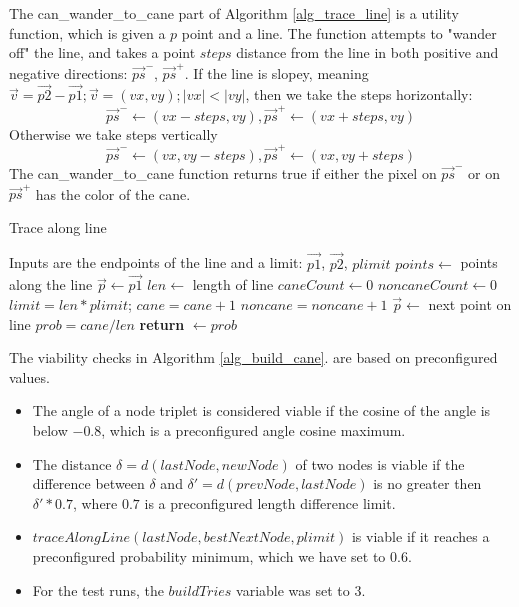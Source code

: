 \documentclass{PSAIE}%
\begin{document}
The can\_wander\_to\_cane part of Algorithm \ref{alg_trace_line} is a utility function, which is given
a $p$ point and a line. The function attempts to "wander off" the line, and takes a point $steps$ distance from the
line in both positive and negative directions: $\vec{ps}^-$, $\vec{ps}^+$. If the line is slopey, meaning
$\vec{v} = \vec{p2} - \vec{p1}; \vec{v} = (vx, vy); |vx| < |vy|$, then we take the steps horizontally:
\[\vec{ps}^- \gets (vx - steps, vy), \vec{ps}^+ \gets (vx + steps, vy)\]
Otherwise we take steps vertically
\[\vec{ps}^- \gets (vx, vy - steps), \vec{ps}^+ \gets (vx, vy + steps)\]
The can\_wander\_to\_cane function returns true if either the pixel on $\vec{ps}^-$ or on $\vec{ps}^+$ has the color
of the cane.

\begin{algorithm}
      \caption{Trace along line}
      \label{alg_trace_line}
      \begin{algorithmic}
            \Comment Inputs are the endpoints of the line and a limit: $\vec{p1}$, $\vec{p2}$, $plimit$
            \State $points \gets$ points along the line
            \State $\vec{p}\gets \vec{p1}$
            \State $len \gets$ length of line
            \State $caneCount \gets 0$
            \State $noncaneCount \gets 0$
            \State $limit = len * plimit$; 
            \State $cane = cane + 1$
            \Else
            \State $noncane = noncane + 1$
            \EndIf
            \State $\vec{p} \gets$ next point on line
            \EndWhile
            \State $prob = cane / len$
            \State \textbf{return} $\gets prob$
            \EndFunction
      \end{algorithmic}
\end{algorithm}

The viability checks in Algorithm \ref{alg_build_cane}. are based on preconfigured values.

\begin{itemize}
      \item The angle of a node triplet is considered viable if the cosine of the angle is below $-0.8$,
            which is a preconfigured angle cosine maximum.
      \item The distance $\delta = d(lastNode, newNode)$ of two nodes is viable if the difference between
            $\delta$ and $\delta' = d(prevNode, lastNode)$ is no greater then $\delta' * 0.7$, where $0.7$
            is a preconfigured length difference limit.
      \item $traceAlongLine(lastNode, bestNextNode, plimit)$ is viable if it reaches a preconfigured
            probability minimum, which we have set to 0.6.
      \item For the test runs, the $buildTries$ variable was set to $3$.
\end{itemize}
\end{document}
